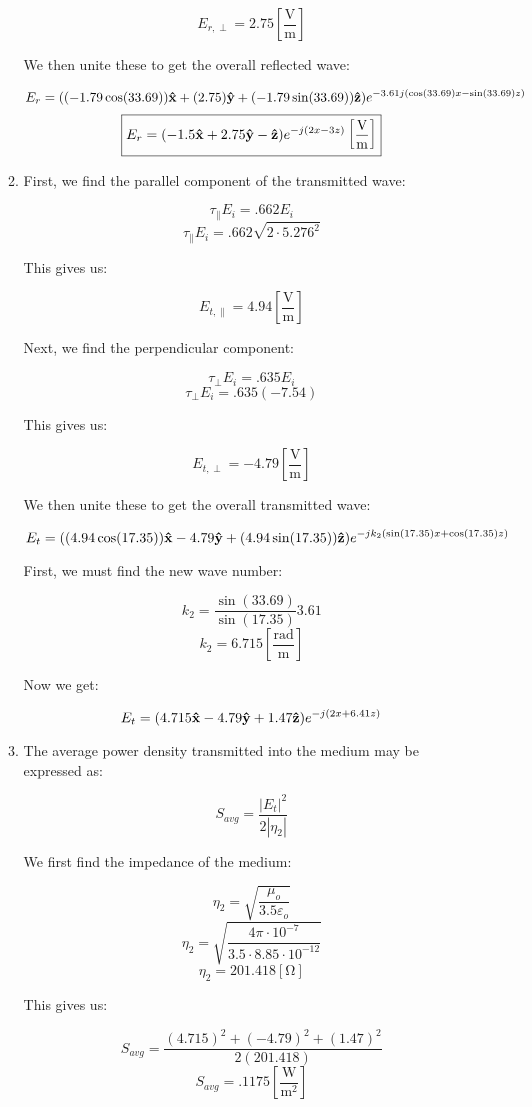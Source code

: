 \begin{enumerate}
\begin{enumerate}
        $$E_{r,\perp}=2.75\left[ \frac{\si{\volt}}{\si{\meter}} \right]$$

        We then unite these to get the overall reflected wave:

        $$E_r=((-1.79\cos(33.69))\bold{\hat{x}}+(2.75)\bold{\hat{y}}+(-1.79\sin(33.69))\bold{\hat{z}})e^{-3.61j(\cos(33.69)x-\sin(33.69)z)}$$
        $$\boxed{E_r=(-1.5\bold{\hat{x}}+2.75\bold{\hat{y}}-\bold{\hat{z}})e^{-j(2x-3z)}\left[ \frac{\si{\volt}}{\si{\meter}} \right]}$$

      \item 

        First, we find the parallel component of the transmitted wave:

        $$\tau_{\parallel}E_i=.662E_i$$
        $$\tau_{\parallel}E_i=.662\sqrt{2\cdot5.276^2}$$

        This gives us:

        $$E_{t,\parallel}=4.94\left[ \frac{\si{\volt}}{\si{\meter}} \right]$$

        Next, we find the perpendicular component:

        $$\tau_{\perp}E_i=.635E_i$$
        $$\tau_{\perp}E_i=.635(-7.54)$$

        This gives us:

        $$E_{t,\perp}=-4.79\left[ \frac{\si{\volt}}{\si{\meter}} \right]$$

        We then unite these to get the overall transmitted wave:

        $$E_t=((4.94\cos(17.35))\bold{\hat{x}}-4.79\bold{\hat{y}}+(4.94\sin(17.35))\bold{\hat{z}})e^{-jk_2(\sin(17.35)x+\cos(17.35)z)}$$

        First, we must find the new wave number:

        $$k_2=\frac{\sin(33.69)}{\sin(17.35)}3.61$$
        $$k_2=6.715\left[ \frac{\text{rad}}{\si{\meter}} \right]$$

        Now we get:

        $$E_t=(4.715\bold{\hat{x}}-4.79\bold{\hat{y}}+1.47\bold{\hat{z}})e^{-j(2x+6.41z)}$$

      \item 

        The average power density transmitted into the medium may be expressed as:

        $$S_{avg}=\frac{|E_t|^2}{2|\eta_2|}$$

        We first find the impedance of the medium:

        $$\eta_2=\sqrt{\frac{\mu_o}{3.5\varepsilon_o}}$$
        $$\eta_2=\sqrt{\frac{4\pi\cdot10^{-7}}{3.5\cdot8.85\cdot10^{-12}}}$$
        $$\eta_2=201.418[\si{\ohm}]$$

        This gives us:

        $$S_{avg}=\frac{(4.715)^2+(-4.79)^2+(1.47)^2}{2(201.418)}$$
        $$\boxed{S_{avg}=.1175\left[ \frac{\si{\watt}}{\si{\meter\squared}} \right]}$$

    \end{enumerate}

\end{enumerate}



